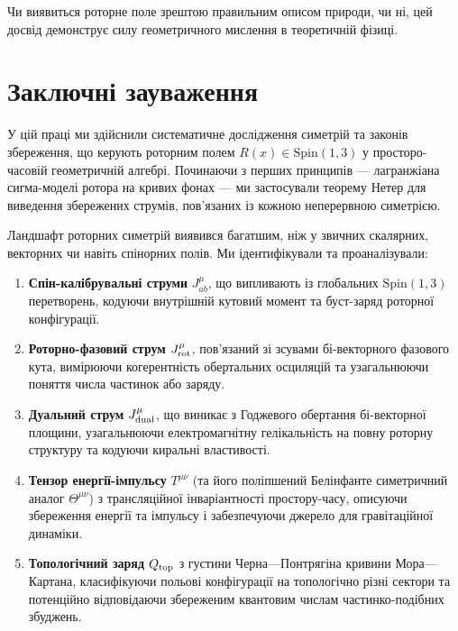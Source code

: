 \documentclass[11pt,a4paper]{article}
\numberwithin{equation}{section}
\theoremstyle{plain}
\theoremstyle{definition}
\theoremstyle{remark}
\begin{document}
Чи виявиться роторне поле зрештою правильним описом природи, чи ні, цей досвід демонструє силу геометричного мислення в теоретичній фізиці.

\section{Заключні зауваження}
\label{sec:conclusion}

У цій праці ми здійснили систематичне дослідження симетрій та законів збереження, що керують роторним полем $R(x) \in \mathrm{Spin}(1,3)$ у просторо-часовій геометричній алгебрі. Починаючи з перших принципів — лагранжіана сигма-моделі ротора на кривих фонах — ми застосували теорему Нетер для виведення збережених струмів, пов'язаних із кожною неперервною симетрією.

Ландшафт роторних симетрій виявився багатшим, ніж у звичних скалярних, векторних чи навіть спінорних полів. Ми ідентифікували та проаналізували:

\begin{enumerate}
  \item \textbf{Спін-калібрувальні струми} $J^\mu_{ab}$, що випливають із глобальних $\mathrm{Spin}(1,3)$ перетворень, кодуючи внутрішній кутовий момент та буст-заряд роторної конфігурації.

  \item \textbf{Роторно-фазовий струм} $J^\mu_{\rm rot}$, пов'язаний зі зсувами бі-векторного фазового кута, вимірюючи когерентність обертальних осциляцій та узагальнюючи поняття числа частинок або заряду.

  \item \textbf{Дуальний струм} $J^\mu_{\rm dual}$, що виникає з Годжевого обертання бі-векторної площини, узагальнюючи електромагнітну гелікальність на повну роторну структуру та кодуючи киральні властивості.

  \item \textbf{Тензор енергії-імпульсу} $T^{\mu\nu}$ (та його поліпшений Белінфанте симетричний аналог $\Theta^{\mu\nu}$) з трансляційної інваріантності простору-часу, описуючи збереження енергії та імпульсу і забезпечуючи джерело для гравітаційної динаміки.

  \item \textbf{Топологічний заряд} $Q_{\rm top}$ з густини Черна—Понтрягіна кривини Мора—Картана, класифікуючи польові конфігурації на топологічно різні сектори та потенційно відповідаючи збереженим квантовим числам частинко-подібних збуджень.
\end{enumerate}
\end{document}
